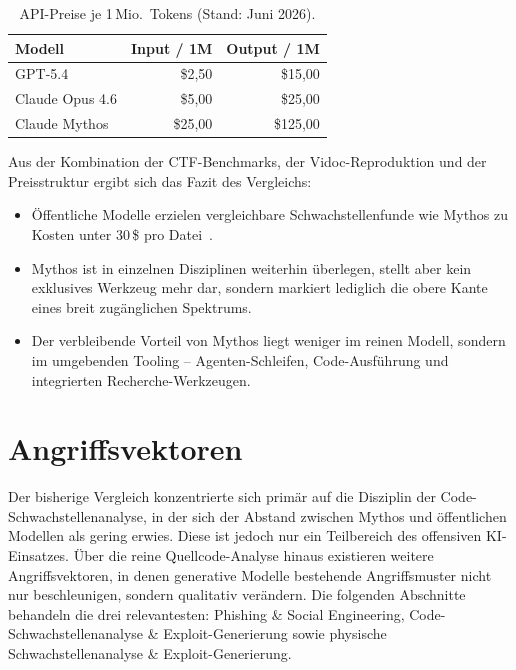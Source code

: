 \documentclass[conference]{IEEEtran}
\begin{document}
\begin{table}[!htbp]
\renewcommand{\arraystretch}{1.2}
\caption{API-Preise je 1\,Mio.~Tokens (Stand: Juni 2026).}
\label{tab:pricing}
\centering
\footnotesize
\begin{tabular}{|l|r|r|}
\hline
\textbf{Modell} & \textbf{Input / 1M} & \textbf{Output / 1M} \\
\hline
GPT-5.4 & \$2{,}50 & \$15{,}00 \\
\hline
Claude Opus 4.6 & \$5{,}00 & \$25{,}00 \\
\hline
Claude Mythos & \$25{,}00 & \$125{,}00 \\
\hline
\end{tabular}
\end{table}

Aus der Kombination der CTF-Benchmarks, der Vidoc-Reproduktion und der Preisstruktur ergibt sich das Fazit des Vergleichs:
\begin{itemize}
  \item Öffentliche Modelle erzielen vergleichbare Schwachstellenfunde wie Mythos zu Kosten unter 30\,\$ pro Datei~\cite{vidoc_mythos_reproduction_2026}.
  \item Mythos ist in einzelnen Disziplinen weiterhin überlegen, stellt aber kein exklusives Werkzeug mehr dar, sondern markiert lediglich die obere Kante eines breit zugänglichen Spektrums.
  \item Der verbleibende Vorteil von Mythos liegt weniger im reinen Modell, sondern im umgebenden Tooling -- Agenten-Schleifen, Code-Ausführung und integrierten Recherche-Werkzeugen.
\end{itemize}

\section{Angriffsvektoren}
Der bisherige Vergleich konzentrierte sich primär auf die Disziplin der Code-Schwachstellenanalyse, in der sich der Abstand zwischen Mythos und öffentlichen Modellen als gering erwies. Diese ist jedoch nur ein Teilbereich des offensiven KI-Einsatzes. Über die reine Quellcode-Analyse hinaus existieren weitere Angriffsvektoren, in denen generative Modelle bestehende Angriffsmuster nicht nur beschleunigen, sondern qualitativ verändern. Die folgenden Abschnitte behandeln die drei relevantesten: Phishing \& Social Engineering, Code-Schwachstellenanalyse \& Exploit-Generierung sowie physische Schwachstellenanalyse \& Exploit-Generierung.
\end{document}
